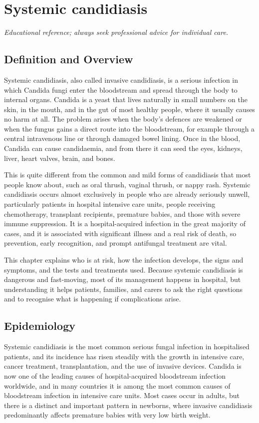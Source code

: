\chapter{Systemic candidiasis}

\medskip
\noindent\textit{Educational reference; always seek professional advice for individual care.}

\section*{Definition and Overview}
Systemic candidiasis, also called invasive candidiasis, is a serious infection in which Candida fungi enter the bloodstream and spread through the body to internal organs. Candida is a yeast that lives naturally in small numbers on the skin, in the mouth, and in the gut of most healthy people, where it usually causes no harm at all. The problem arises when the body's defences are weakened or when the fungus gains a direct route into the bloodstream, for example through a central intravenous line or through damaged bowel lining. Once in the blood, Candida can cause candidaemia, and from there it can seed the eyes, kidneys, liver, heart valves, brain, and bones.

This is quite different from the common and mild forms of candidiasis that most people know about, such as oral thrush, vaginal thrush, or nappy rash. Systemic candidiasis occurs almost exclusively in people who are already seriously unwell, particularly patients in hospital intensive care units, people receiving chemotherapy, transplant recipients, premature babies, and those with severe immune suppression. It is a hospital-acquired infection in the great majority of cases, and it is associated with significant illness and a real risk of death, so prevention, early recognition, and prompt antifungal treatment are vital.

This chapter explains who is at risk, how the infection develops, the signs and symptoms, and the tests and treatments used. Because systemic candidiasis is dangerous and fast-moving, most of its management happens in hospital, but understanding it helps patients, families, and carers to ask the right questions and to recognise what is happening if complications arise.

\section*{Epidemiology}
Systemic candidiasis is the most common serious fungal infection in hospitalised patients, and its incidence has risen steadily with the growth in intensive care, cancer treatment, transplantation, and the use of invasive devices. Candida is now one of the leading causes of hospital-acquired bloodstream infection worldwide, and in many countries it is among the most common causes of bloodstream infection in intensive care units. Most cases occur in adults, but there is a distinct and important pattern in newborns, where invasive candidiasis predominantly affects premature babies with very low birth weight.

